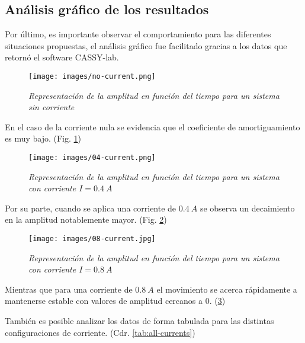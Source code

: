 \documentclass[spanish,notitlepage,letterpaper, 12pt]{article}
\begin{document}
\subsection{Análisis gráfico de los resultados}
Por último, es importante observar el comportamiento para las diferentes situaciones propuestas, el análisis gráfico fue facilitado gracias a los datos que retornó el software CASSY-lab.
\begin{figure}[ht]
    \centering
    \texttt{[image: images/no-current.png]}
    \caption{\textit{Representación de la amplitud en función del tiempo para un sistema sin corriente}}
    \label{fig:no-current}
\end{figure}
En el caso de la corriente nula se evidencia que el coeficiente de amortiguamiento es muy bajo. (Fig. \ref{fig:no-current})
\begin{figure}[ht]
    \centering
    \texttt{[image: images/04-current.png]}
    \caption{\textit{Representación de la amplitud en función del tiempo para un sistema con corriente $I=0.4\ A$}}
    \label{fig:04-current}
\end{figure}
Por su parte, cuando se aplica una corriente de $0.4\ A$ se observa un decaimiento en la amplitud notablemente mayor. (Fig. \ref{fig:04-current})
\begin{figure}[ht]
    \centering
    \texttt{[image: images/08-current.jpg]}
    \caption{\textit{Representación de la amplitud en función del tiempo para un sistema con corriente $I=0.8\ A$}}
    \label{fig:08-current}
\end{figure}
Mientras que para una corriente de $0.8\ A$ el movimiento se acerca rápidamente a mantenerse estable con valores de amplitud cercanos a $0$. (\ref{fig:08-current})\par
\newpage
También es posible analizar los datos de forma tabulada para las distintas configuraciones de corriente. (Cdr. \ref{tab:all-currents})
\end{document}
